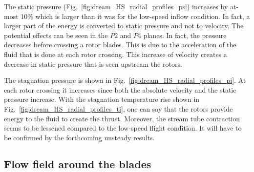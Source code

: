 The static pressure (Fig.~\ref{fig:dream_HS_radial_profiles_ps}) increases
by at-most 10\% which is larger than it was for the low-speed
inflow condition. In fact, a larger part of the energy is converted to static
pressure and not to velocity. The potential effects can be seen in the
$P2$ and $P4$ planes. In fact, the pressure decreases before
crossing a rotor blades. This is due to the acceleration of the
fluid that is done at each rotor crossing. This increase of velocity
creates a decrease in static pressure that is seen upstream the rotors.

The stagnation pressure is shown in Fig.~\ref{fig:dream_HS_radial_profiles_pi}.
At each rotor crossing it increases since both the absolute velocity and
the static pressure increase. 
With the stagnation temperature rise shown
in Fig.~\ref{fig:dream_HS_radial_profiles_ti}, one can say that
the rotors provide energy to the fluid to create the thrust.
Moreover, the stream tube contraction seems to be lessened
compared to the low-speed flight condition. It will have to be
confirmed by the forthcoming unsteady results.



\subsection{Flow field around the blades}
\label{sub:dream_hs_blades}

